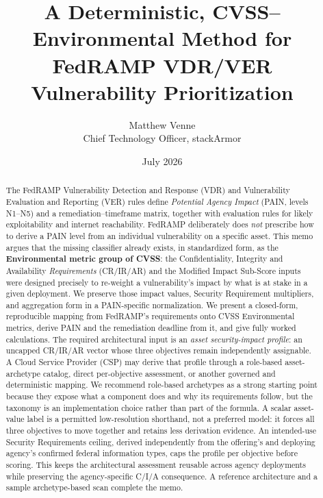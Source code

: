 \documentclass[11pt]{article}
\title{\bfseries A Deterministic, CVSS--Environmental Method for\\
FedRAMP VDR/VER Vulnerability Prioritization}
\author{Matthew Venne \\ \small Chief Technology Officer, stackArmor}
\date{July 2026}
\begin{document}
\maketitle

\begin{abstract}
\noindent
The FedRAMP Vulnerability Detection and Response (VDR) and Vulnerability
Evaluation and Reporting (VER) rules define \emph{Potential Agency Impact} (PAIN,
levels N1--N5) and a remediation--timeframe matrix, together with evaluation rules
for likely exploitability and internet reachability. FedRAMP deliberately does
\emph{not} prescribe how to derive a PAIN level from an individual vulnerability on
a specific asset. This memo argues that the missing classifier already exists, in
standardized form, as the \textbf{Environmental metric group of CVSS}: the
Confidentiality, Integrity and Availability \emph{Requirements} (CR/IR/AR) and the
Modified Impact Sub-Score inputs were designed precisely to re-weight a
vulnerability's impact by what is at stake in a given deployment. We preserve
those impact values, Security Requirement multipliers, and aggregation form in a
PAIN-specific normalization. We present a closed-form,
reproducible mapping from FedRAMP's requirements onto CVSS Environmental metrics,
derive PAIN and the remediation deadline from it, and give fully worked
calculations. The required architectural input is an \emph{asset security-impact
profile}: an uncapped CR/IR/AR vector whose three objectives remain independently
assignable. A Cloud Service Provider (CSP) may derive that profile through a
role-based asset-archetype catalog, direct per-objective assessment, or another
governed and deterministic mapping. We recommend role-based archetypes as a strong
starting point because they expose what a component does and why its requirements
follow, but the taxonomy is an implementation choice rather than part of the
formula. A scalar asset-value label is a permitted low-resolution shorthand, not a
preferred model: it forces all three objectives to move together and retains less
derivation evidence. An intended-use Security Requirements ceiling, derived
independently from the offering's and deploying agency's confirmed federal
information types, caps the profile per objective before scoring. This keeps the
architectural assessment reusable across agency deployments while preserving the
agency-specific C/I/A consequence. A reference architecture and a sample
archetype-based scan complete the memo.
\end{abstract}
\end{document}
